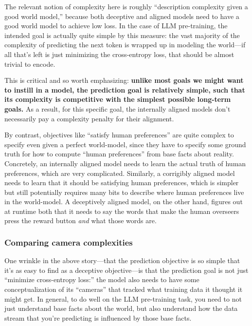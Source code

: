\documentclass[
  onecolumn,
  nonatbib,
]{miri-tech-article}
\begin{document}
The relevant notion of complexity here is roughly ``description complexity given a good world model,'' because both deceptive and aligned models need to have a good world model to achieve low loss. In the case of LLM pre-training, the intended goal is actually quite simple by this measure: the vast majority of the complexity of predicting the next token is wrapped up in modeling the world---if all that's left is just minimizing the cross-entropy loss, that should be almost trivial to encode.

This is critical and so worth emphasizing: \textbf{unlike most goals we might want to instill in a model, the prediction goal is relatively simple, such that its complexity is competitive with the simplest possible long-term goals.} As a result, for this specific goal, the internally aligned models don't necessarily pay a complexity penalty for their alignment.

By contrast, objectives like ``satisfy human preferences'' are quite complex to specify even given a perfect world-model, since they have to specify some ground truth for how to compute ``human preferences'' from base facts about reality. Concretely, an internally aligned model needs to learn the actual truth of human preferences, which are very complicated. Similarly, a corrigibly aligned model needs to learn that it should be satisfying human preferences, which is simpler but still potentially requires many bits to describe where human preferences live in the world-model. A deceptively aligned model, on the other hand, figures out at runtime both that it needs to say the words that make the human overseers press the reward button \textit{and} what those words are.


\subsubsection{Comparing camera complexities}

One wrinkle in the above story---that the prediction objective is so simple that it's as easy to find as a deceptive objective---is that the prediction goal is not just ``minimize cross-entropy loss:'' the model also needs to have some conceptualization of its ``cameras'' that tracked what training data it thought it might get. In general, to do well on the LLM pre-training task, you need to not just understand base facts about the world, but also understand how the data stream that you're predicting is influenced by those base facts.
\end{document}
